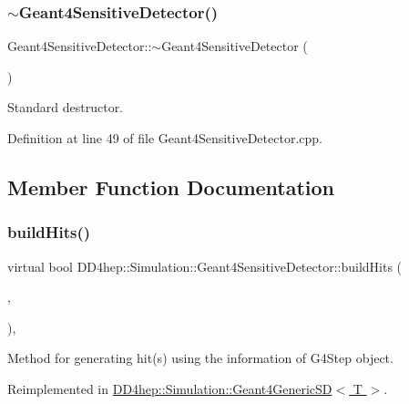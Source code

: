 \subsubsection{\texorpdfstring{$\sim$\+Geant4\+Sensitive\+Detector()}{~Geant4SensitiveDetector()}}
{\footnotesize\ttfamily Geant4\+Sensitive\+Detector\+::$\sim$\+Geant4\+Sensitive\+Detector (\begin{DoxyParamCaption}{ }\end{DoxyParamCaption})\hspace{0.3cm}{\ttfamily [virtual]}}



Standard destructor. 



Definition at line 49 of file Geant4\+Sensitive\+Detector.\+cpp.



\subsection{Member Function Documentation}
\hypertarget{class_d_d4hep_1_1_simulation_1_1_geant4_sensitive_detector_a96d4594c8e1af23ef5c572938460670e}{}\label{class_d_d4hep_1_1_simulation_1_1_geant4_sensitive_detector_a96d4594c8e1af23ef5c572938460670e} 
\subsubsection{\texorpdfstring{build\+Hits()}{buildHits()}}
{\footnotesize\ttfamily virtual bool D\+D4hep\+::\+Simulation\+::\+Geant4\+Sensitive\+Detector\+::build\+Hits (\begin{DoxyParamCaption}\item[{G4\+Step $\ast$}]{,  }\item[{G4\+Touchable\+History $\ast$}]{ }\end{DoxyParamCaption})\hspace{0.3cm}{\ttfamily [inline]}, {\ttfamily [virtual]}}



Method for generating hit(s) using the information of G4\+Step object. 



Reimplemented in \hyperlink{class_d_d4hep_1_1_simulation_1_1_geant4_generic_s_d_a72d6c9cb683b9a0bd58fdbd17dc94be6}{D\+D4hep\+::\+Simulation\+::\+Geant4\+Generic\+S\+D$<$ T $>$}.



